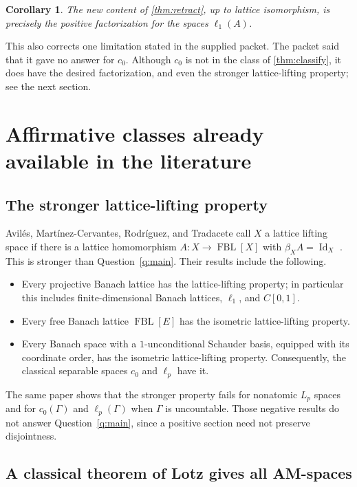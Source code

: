 \documentclass[11pt]{article}
\newtheorem{corollary}[theorem]{Corollary}
\newcommand{\FBL}{\operatorname{FBL}}
\newcommand{\Id}{\operatorname{Id}}
\begin{document}
\begin{corollary}
The new content of \cref{thm:retract}, up to lattice isomorphism, is precisely
the positive factorization for the spaces $\ell_1(A)$.
\end{corollary}

This also corrects one limitation stated in the supplied packet.  The packet
said that it gave no answer for $c_0$.  Although $c_0$ is not in the class of
\cref{thm:classify}, it does have the desired factorization, and even the
stronger lattice-lifting property; see the next section.

\section{Affirmative classes already available in the literature}

\subsection{The stronger lattice-lifting property}

Avil\'es, Mart\'inez-Cervantes, Rodr\'iguez, and Tradacete call $X$ a lattice
lifting space if there is a lattice homomorphism
$A:X\to\FBL[X]$ with $\beta_XA=\Id_X$ \cite{AvilesEtAl2022}.  This is stronger
than Question~\ref{q:main}.  Their results include the following.
\begin{itemize}[leftmargin=2em]
\item Every projective Banach lattice has the lattice-lifting property; in
particular this includes finite-dimensional Banach lattices, $\ell_1$, and
$C[0,1]$.
\item Every free Banach lattice $\FBL[E]$ has the isometric lattice-lifting
property.
\item Every Banach space with a $1$-unconditional Schauder basis, equipped
with its coordinate order, has the isometric lattice-lifting property.
Consequently, the classical separable spaces $c_0$ and $\ell_p$ have it.
\end{itemize}
The same paper shows that the stronger property fails for nonatomic $L_p$
spaces and for $c_0(\Gamma)$ and $\ell_p(\Gamma)$ when $\Gamma$ is uncountable.
Those negative results do not answer Question~\ref{q:main}, since a positive section
need not preserve disjointness.

\subsection{A classical theorem of Lotz gives all AM-spaces}
\end{document}
